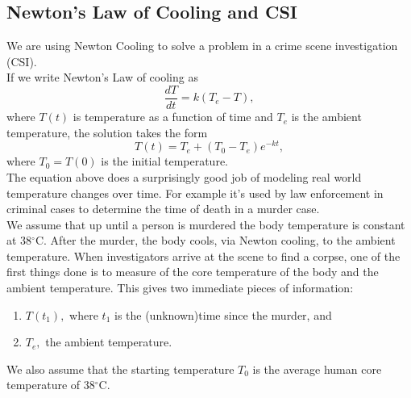 \subsection{Newton's Law of Cooling and CSI}
We are using Newton Cooling to solve a problem in a crime scene investigation (CSI).\\

If we write Newton's Law of cooling as
\begin{equation*}
  \frac{dT}{dt} = k\left(T_ e-T\right),
\end{equation*}
where $T(t)$ is temperature as a function of time and $T_e$ is the ambient temperature,
the solution takes the form
\begin{equation*}
  T(t)=T_ e+\left(T_0-T_ e\right)e^{-kt},
\end{equation*}
where $T_0 = T(0)$ is the initial temperature. \\

The equation above does a surprisingly good job of modeling real world temperature changes over time.
For example it's used by law enforcement in criminal cases to determine the time of death in a murder case.\\

We assume that up until a person is murdered the body temperature is constant at $38{}^{\circ }\text {C}$.
After the murder, the body cools, via Newton cooling, to the ambient temperature.
When investigators arrive at the scene to find a corpse,
one of the first things done is to measure of the core temperature of the body and the ambient temperature.
This gives two immediate pieces of information: \\
\begin{enumerate}
\item $T(t_1),$ where $t_1$ is the (unknown)time since the murder, and
\item $T_e,$ the ambient temperature. 
\end{enumerate}

We also assume that the starting temperature $T_0$
is the average human core temperature of $38{}^{\circ }\text {C}$.
\clearpage

